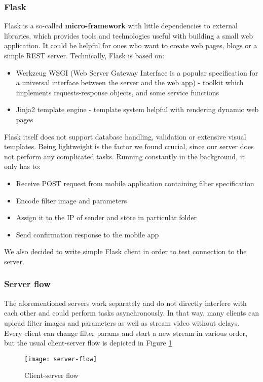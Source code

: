 \documentclass[../Main.tex]{subfiles}
\begin{document}
    \subsubsection{Flask}
    Flask is a so-called \textbf{micro-framework} with little dependencies to external libraries, which provides tools and technologies useful with building a small web application. It could be helpful for ones who want to create web pages, blogs or a simple REST server. 
    Technically, Flask is based on:
    \begin{itemize}
    \item Werkzeug WSGI (Web Server Gateway Interface is a popular specification for a universal interface between the  server and the web app) - toolkit which implements requests-response objects, and some service functions
    \item Jinja2 template engine - template system helpful with rendering dynamic web pages
    \end{itemize}
    Flask itself does not support database handling, validation or extensive visual templates. Being lightweight is the factor we found crucial, since our server does not perform any complicated tasks. Running constantly in the background, it only has to:
    \begin{itemize}
    \item Receive POST request from mobile application containing filter specification 
    \item Encode filter image and parameters
    \item Assign it to the IP of sender and store in particular folder
    \item Send confirmation response to the mobile app
    \end{itemize}
    We also decided to write simple Flask client in order to test connection to the server.
    
    \subsubsection{Server flow}
    The aforementioned servers work separately and do not directly interfere with each other and could perform tasks asynchronously. In that way, many clients can upload filter images and parameters as well as stream video without delays. Every client can change filter params and start a new stream in various order, but the usual client-server flow is depicted in Figure \ref{fig:server-flow} \\
    \begin{figure}[h]
    \centering
    \texttt{[image: server-flow]}
    \caption{Client-server flow}
        \label{fig:server-flow}
    \end{figure}
    
\end{document}
